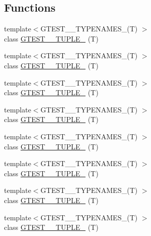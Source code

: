 \subsection*{Functions}
\begin{DoxyCompactItemize}
\item 
{\footnotesize template$<$G\+T\+E\+S\+T\+\_\+\_\+\+T\+Y\+P\+E\+N\+A\+M\+E\+S\+\_\+(\+T) $>$ }\\class \hyperlink{namespacestd_1_1tr1_a9971f52f994f142fe36c786b991cfd3e}{G\+T\+E\+S\+T\+\_\+\_\+\+T\+U\+P\+L\+E\+\_\+} (T)
\item 
{\footnotesize template$<$G\+T\+E\+S\+T\+\_\+\_\+\+T\+Y\+P\+E\+N\+A\+M\+E\+S\+\_\+(\+T) $>$ }\\class \hyperlink{namespacestd_1_1tr1_a05651180c3a4c06fe0f3b09144b82b93}{G\+T\+E\+S\+T\+\_\+\_\+\+T\+U\+P\+L\+E\+\_\+} (T)
\item 
{\footnotesize template$<$G\+T\+E\+S\+T\+\_\+\_\+\+T\+Y\+P\+E\+N\+A\+M\+E\+S\+\_\+(\+T) $>$ }\\class \hyperlink{namespacestd_1_1tr1_a368170c49cc7d7f130c0564bbad01205}{G\+T\+E\+S\+T\+\_\+\_\+\+T\+U\+P\+L\+E\+\_\+} (T)
\item 
{\footnotesize template$<$G\+T\+E\+S\+T\+\_\+\_\+\+T\+Y\+P\+E\+N\+A\+M\+E\+S\+\_\+(\+T) $>$ }\\class \hyperlink{namespacestd_1_1tr1_a661b17d2b7137863f06a016762f5c888}{G\+T\+E\+S\+T\+\_\+\_\+\+T\+U\+P\+L\+E\+\_\+} (T)
\item 
{\footnotesize template$<$G\+T\+E\+S\+T\+\_\+\_\+\+T\+Y\+P\+E\+N\+A\+M\+E\+S\+\_\+(\+T) $>$ }\\class \hyperlink{namespacestd_1_1tr1_a51b070e2eb5e6bb83a290f35c19667dd}{G\+T\+E\+S\+T\+\_\+\_\+\+T\+U\+P\+L\+E\+\_\+} (T)
\item 
{\footnotesize template$<$G\+T\+E\+S\+T\+\_\+\_\+\+T\+Y\+P\+E\+N\+A\+M\+E\+S\+\_\+(\+T) $>$ }\\class \hyperlink{namespacestd_1_1tr1_a485b05fdbbcfcf7ad5e4234e17702268}{G\+T\+E\+S\+T\+\_\+\_\+\+T\+U\+P\+L\+E\+\_\+} (T)
\item 
{\footnotesize template$<$G\+T\+E\+S\+T\+\_\+\_\+\+T\+Y\+P\+E\+N\+A\+M\+E\+S\+\_\+(\+T) $>$ }\\class \hyperlink{namespacestd_1_1tr1_ab451b390a95ee0555d7a43b67ea348aa}{G\+T\+E\+S\+T\+\_\+\_\+\+T\+U\+P\+L\+E\+\_\+} (T)
\item 
{\footnotesize template$<$G\+T\+E\+S\+T\+\_\+\_\+\+T\+Y\+P\+E\+N\+A\+M\+E\+S\+\_\+(\+T) $>$ }\\class \hyperlink{namespacestd_1_1tr1_ab2b1c72e9db7436909d9ac011645f29d}{G\+T\+E\+S\+T\+\_\+\_\+\+T\+U\+P\+L\+E\+\_\+} (T)

\end{DoxyCompactItemize}
